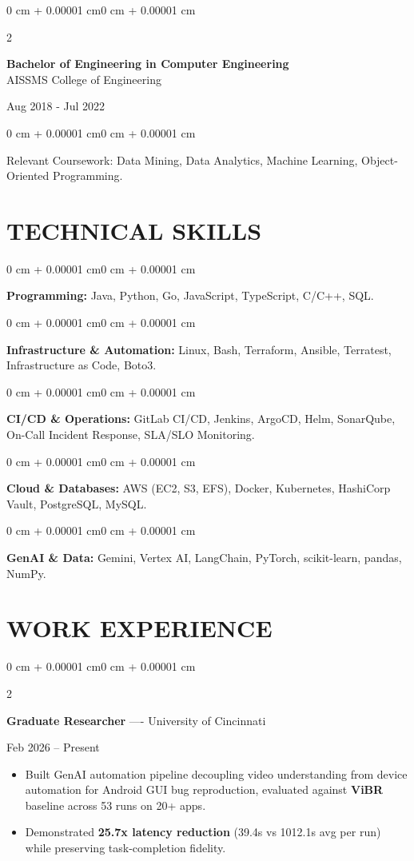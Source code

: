 \documentclass[10pt, letterpaper]{article}
\newenvironment{highlights}{
    \begin{itemize}[
        topsep=0.10 cm,
        parsep=0.06 cm,
        partopsep=0pt,
        itemsep=0.06 cm,
        leftmargin=12pt
    ]
}{
    \end{itemize}
}
\newenvironment{onecolentry}{
    \begin{adjustwidth}{0 cm + 0.00001 cm}{0 cm + 0.00001 cm}
}{
    \end{adjustwidth}
}
\newenvironment{twocolentry}[2][]{
    \onecolentry
    \def\secondColumn{#2}
    \setcolumnwidth{\fill, 4.5 cm}
    \begin{paracol}{2}
}{
    \switchcolumn \raggedleft \secondColumn
    \end{paracol}
    \endonecolentry
}
\begin{document}
\begin{twocolentry}{
    Aug 2018 - Jul 2022
}
    \textbf{Bachelor of Engineering in Computer Engineering} \\
    AISSMS College of Engineering
\end{twocolentry}
\begin{onecolentry}
Relevant Coursework: Data Mining, Data Analytics, Machine Learning, Object-Oriented Programming.
\end{onecolentry}
\section{TECHNICAL SKILLS}
\begin{onecolentry}
\textbf{Programming:} Java, Python, Go, JavaScript, TypeScript, C/C++, SQL.
\end{onecolentry}
\vspace{0.06 cm}
\begin{onecolentry}
\textbf{Infrastructure \& Automation:} Linux, Bash, Terraform, Ansible, Terratest, Infrastructure as Code, Boto3.
\end{onecolentry}
\vspace{0.06 cm}
\begin{onecolentry}
\textbf{CI/CD \& Operations:} GitLab CI/CD, Jenkins, ArgoCD, Helm, SonarQube, On-Call Incident Response, SLA/SLO Monitoring.
\end{onecolentry}
\vspace{0.06 cm}
\begin{onecolentry}
\textbf{Cloud \& Databases:} AWS (EC2, S3, EFS), Docker, Kubernetes, HashiCorp Vault, PostgreSQL, MySQL.
\end{onecolentry}
\vspace{0.06 cm}
\begin{onecolentry}
\textbf{GenAI \& Data:} Gemini, Vertex AI, LangChain, PyTorch, scikit-learn, pandas, NumPy.
\end{onecolentry}

\section{WORK EXPERIENCE}
\begin{twocolentry}{Feb 2026 -- Present}
\textbf{Graduate Researcher} ---- University of Cincinnati
\end{twocolentry}
\begin{highlights}
  \item Built GenAI automation pipeline decoupling video understanding from device automation for Android GUI bug reproduction, evaluated against \textbf{ViBR} baseline across 53 runs on 20+ apps.
  \item Demonstrated \textbf{25.7x latency reduction} (39.4s vs 1012.1s avg per run) while preserving task-completion fidelity.
\end{highlights}
\end{document}
